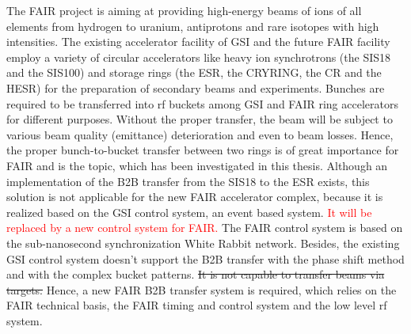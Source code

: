 The FAIR project is aiming at providing high-energy beams of ions of all elements from hydrogen to uranium, antiprotons and rare isotopes with high intensities. The existing accelerator facility of GSI and the future FAIR facility employ a variety of circular accelerators like heavy ion synchrotrons (the SIS18 and the SIS100) and storage rings (the ESR, the CRYRING, the CR and the HESR) for the preparation of secondary beams and experiments. Bunches are required to be transferred into rf buckets among GSI and FAIR ring accelerators for different purposes. Without the proper transfer, the beam will be subject to various beam quality (emittance) deterioration and even to beam losses. Hence, the proper bunch-to-bucket transfer between two rings is of great importance for FAIR and is the topic, which has been investigated in this thesis. Although an implementation of the B2B transfer from the SIS18 to the ESR exists, this solution is not applicable for the new FAIR accelerator complex, because it is realized based on the GSI control system, an event based system. \textcolor{red}{It will be replaced by a new control system for FAIR.} The FAIR control system is based on the sub-nanosecond synchronization White Rabbit network. Besides, the existing GSI control system doesn't support the B2B transfer with the phase shift method and with the complex bucket patterns. \sout{It is not capable to transfer beams via targets.} Hence, a new FAIR B2B transfer system is required, which relies on the FAIR technical basis, the FAIR timing and control system and the low level rf system.



